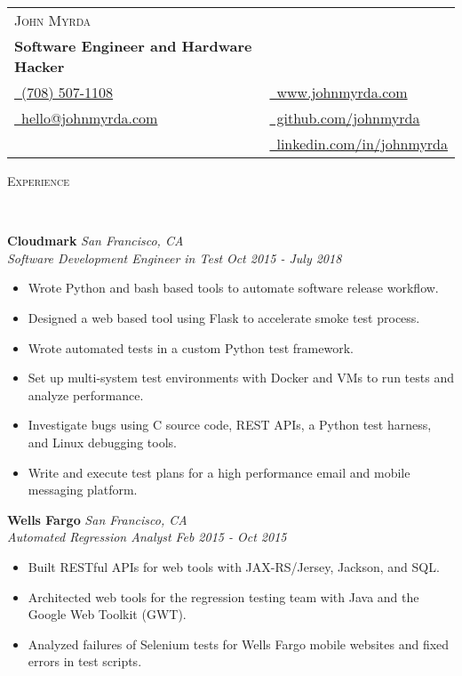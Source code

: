 \documentclass{article}
\newenvironment{changemargin}[2]{%
  \begin{list}{}{%
    \setlength{\topsep}{0pt}%
    \setlength{\leftmargin}{#1}%
    \setlength{\rightmargin}{#2}%
    \setlength{\listparindent}{\parindent}%
    \setlength{\itemindent}{\parindent}%
    \setlength{\parsep}{\parskip}%
  }%
  \item[]}{\end{list}
}
\newcommand{\lineover}{
	\begin{changemargin}{-0.05in}{-0.05in}
		\vspace*{-8pt}
		\hrulefill \\
		\vspace*{-2pt}
	\end{changemargin}
}
\newcommand{\header}[1]{
	\begin{changemargin}{-0.5in}{-0.5in}
		\scshape{#1}\\
  	\lineover
	\end{changemargin}
}
\newcommand{\contact}[7]{
	\begin{changemargin}{-0.5in}{-0.5in}
		\begin{tabular}{l l}
			\Large \scshape {#1}\\
			\textbf{#2}\\
			{#3} & {#5}\\ 
			{#4} & {#6}\\
			 & {#7}\\
		\end{tabular}
	\end{changemargin}
}
\newenvironment{body} {
	\vspace*{-16pt}
	\begin{changemargin}{-0.25in}{-0.5in}
  }	
	{\end{changemargin}
}
\begin{document}
\contact{John Myrda}
{Software Engineer and Hardware Hacker}
{\href{tel:7085071108}{\faPhone\ (708) 507-1108}}
{\href{mailto:hello@johnmyrda.com}{\faEnvelope\ hello@johnmyrda.com}}
{\href{https://www.johnmyrda.com}{\faLink\ www.johnmyrda.com}}
{\href{https://github.com/johnmyrda/resume}{\faGithub\ github.com/johnmyrda}}
{\href{https://www.linkedin.com/in/johnmyrda}{\faLinkedin\ linkedin.com/in/johnmyrda}}




\header{Experience}


\begin{body}

	\vspace{20pt}
	\textbf{Cloudmark} \hfill \emph{San Francisco, CA}\\
	\emph{Software Development Engineer in Test} \hfill \emph{Oct 2015 - July 2018}\\
	\begin{itemize} \itemsep -0pt  %
	    \item Wrote Python and bash based tools to automate software release workflow.
		\item Designed a web based tool using Flask to accelerate smoke test process.
		\item Wrote automated tests in a custom Python test framework.
		\item Set up multi-system test environments with Docker and VMs to run tests and analyze performance.
\item Investigate bugs using C source code, REST APIs, a Python test harness, and Linux debugging tools.
		\item Write and execute test plans for a high performance email and mobile messaging platform.
	\end{itemize}

	\textbf{Wells Fargo} \hfill \emph{San Francisco, CA}\\
	\emph{Automated Regression Analyst} \hfill \emph{Feb 2015 - Oct 2015}\\
	\begin{itemize} \itemsep -0pt  %
		\item Built RESTful APIs for web tools with JAX-RS/Jersey, Jackson, and SQL.
		\item Architected web tools for the regression testing team with Java and the Google Web Toolkit (GWT).
		\item Analyzed failures of Selenium tests for Wells Fargo mobile websites and fixed errors in test scripts.	
	\end{itemize}


\end{body}
\end{document}
